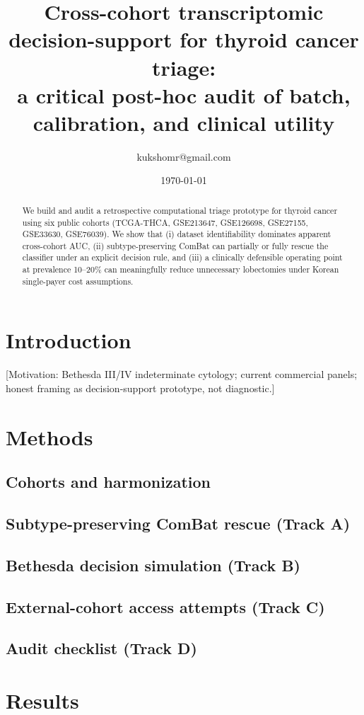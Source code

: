 \documentclass[11pt]{article}
\title{Cross-cohort transcriptomic decision-support for thyroid cancer triage:\\
a critical post-hoc audit of batch, calibration, and clinical utility}
\author{kukshomr@gmail.com}
\date{\today}
\begin{document}
\maketitle

\begin{abstract}
We build and audit a retrospective computational triage prototype for
thyroid cancer using six public cohorts (TCGA-THCA, GSE213647, GSE126698,
GSE27155, GSE33630, GSE76039). We show that (i) dataset identifiability
dominates apparent cross-cohort AUC, (ii) subtype-preserving ComBat can
partially or fully rescue the classifier under an explicit decision rule,
and (iii) a clinically defensible operating point at prevalence 10--20\%
can meaningfully reduce unnecessary lobectomies under Korean single-payer
cost assumptions.
\end{abstract}

\section{Introduction}
[Motivation: Bethesda III/IV indeterminate cytology; current commercial
panels; honest framing as decision-support prototype, not diagnostic.]

\section{Methods}
\subsection{Cohorts and harmonization}
\subsection{Subtype-preserving ComBat rescue (Track A)}
\subsection{Bethesda decision simulation (Track B)}
\subsection{External-cohort access attempts (Track C)}
\subsection{Audit checklist (Track D)}

\section{Results}
\end{document}
